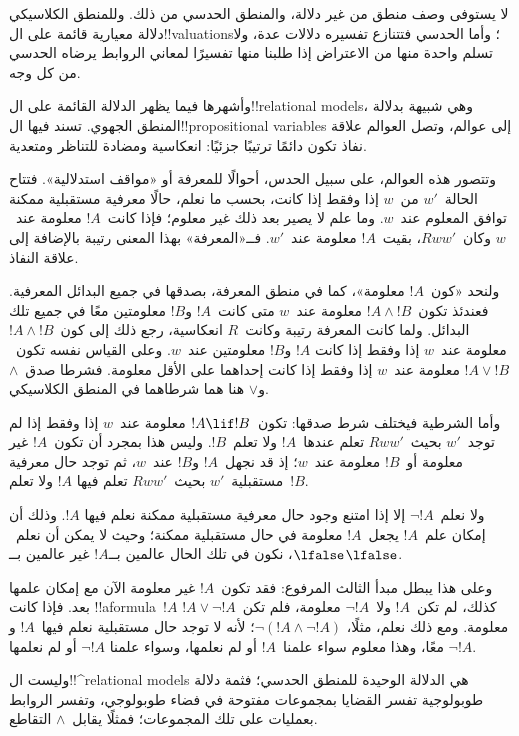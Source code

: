 \documentclass[../../../include/open-logic-section]{subfiles}
\begin{document}


لا يستوفى وصف منطق من غير دلالة، والمنطق الحدسي من ذلك. وللمنطق الكلاسيكي
دلالة معيارية قائمة على ال!!{valuation}s؛ وأما الحدسي فتتنازع تفسيره
دلالات عدة، ولا تسلم واحدة منها من الاعتراض إذا طلبنا منها تفسيرًا لمعاني
الروابط يرضاه الحدسي من كل وجه.

وأشهرها فيما يظهر الدلالة القائمة على ال!!{relational model}s، وهي شبيهة
بدلالة المنطق الجهوي. تسند فيها ال!!{propositional variable}s إلى عوالم،
وتصل العوالم علاقة نفاذ تكون دائمًا ترتيبًا جزئيًا: انعكاسية ومضادة للتناظر
ومتعدية.

وتتصور هذه العوالم، على سبيل الحدس، أحوالًا للمعرفة أو «مواقف استدلالية».
فتتاح الحالة~$w'$ من~$w$ إذا وفقط إذا كانت، بحسب ما نعلم، حالًا معرفية
مستقبلية ممكنة توافق المعلوم عند~$w$. وما علم لا يصير بعد ذلك غير معلوم؛
فإذا كانت~$!A$ معلومة عند~$w$ وكان~$Rww'$، بقيت~$!A$ معلومة عند~$w'$.
فــ«المعرفة» بهذا المعنى رتيبة بالإضافة إلى علاقة النفاذ.

ولنحد «كون~$!A$ معلومة»، كما في منطق المعرفة، بصدقها في جميع البدائل
المعرفية. فعندئذ تكون~$!A \land !B$ معلومة عند~$w$ متى كانت~$!A$ و$!B$
معلومتين معًا في جميع تلك البدائل. ولما كانت المعرفة رتيبة وكانت~$R$
انعكاسية، رجع ذلك إلى كون~$!A \land !B$ معلومة عند~$w$ إذا وفقط إذا كانت
$!A$ و$!B$ معلومتين عند~$w$. وعلى القياس نفسه تكون~$!A \lor !B$ معلومة
عند~$w$ إذا وفقط إذا كانت إحداهما على الأقل معلومة. فشرطا صدق~$\land$
و$\lor$ هنا هما شرطاهما في المنطق الكلاسيكي.

وأما الشرطية فيختلف شرط صدقها: تكون~$!A \lif !B$ معلومة عند~$w$ إذا وفقط
إذا لم توجد~$w'$ بحيث~$Rww'$ تعلم عندها~$!A$ ولا تعلم~$!B$. وليس هذا
بمجرد أن تكون~$!A$ غير معلومة أو~$!B$ معلومة عند~$w$؛ إذ قد نجهل~$!A$
و$!B$ عند~$w$، ثم توجد حال معرفية مستقبلية~$w'$ بحيث~$Rww'$ تعلم فيها
$!A$ ولا تعلم~$!B$.

ولا نعلم~$\lnot !A$ إلا إذا امتنع وجود حال معرفية مستقبلية ممكنة نعلم فيها
$!A$. وذلك أن إمكان علم~$!A$ يجعل~$!A$ معلومة في حال مستقبلية ممكنة؛ وحيث
لا يمكن أن نعلم~$\lfalse$، نكون في تلك الحال عالمين بــ$!A$ غير عالمين
بــ$\lfalse$.

وعلى هذا يبطل مبدأ الثالث المرفوع: فقد تكون~$!A$ غير معلومة الآن مع إمكان
علمها بعد. فإذا كانت !!a{formula}~$!A$ كذلك، لم تكن~$!A$ ولا~$\lnot !A$
معلومة، فلم تكن~$!A \lor \lnot !A$ معلومة. ومع ذلك نعلم، مثلًا،
$\lnot(!A \land \lnot !A)$؛ لأنه لا توجد حال مستقبلية نعلم فيها~$!A$
و$\lnot !A$ معًا، وهذا معلوم سواء علمنا~$!A$ أو لم نعلمها، وسواء علمنا
$\lnot !A$ أو لم نعلمها.

وليست ال!!^{relational model}s هي الدلالة الوحيدة للمنطق الحدسي؛ فثمة
دلالة طوبولوجية تفسر القضايا بمجموعات مفتوحة في فضاء طوبولوجي، وتفسر
الروابط بعمليات على تلك المجموعات؛ فمثلًا يقابل~$\land$ التقاطع.
\end{document}
